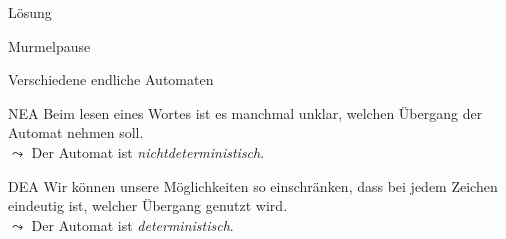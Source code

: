 {
\begin{frame}{Lösung}
\end{frame}
}

\begin{frame}[standout]
  Murmelpause
\end{frame}

\begin{frame}[fragile]{Verschiedene endliche Automaten}
\begin{alertblock}{NEA}
Beim lesen eines Wortes ist es manchmal unklar, welchen Übergang der Automat nehmen soll.\\
$\leadsto$ Der Automat ist \emph{\alert{nichtdeterministisch}}.
\end{alertblock}
\begin{alertblock}{DEA}
Wir können unsere Möglichkeiten so einschränken, dass bei jedem Zeichen eindeutig ist, welcher Übergang genutzt wird.\\
$\leadsto$ Der Automat ist \alert{\emph{deterministisch}}.
\end{alertblock}
\end{frame}

